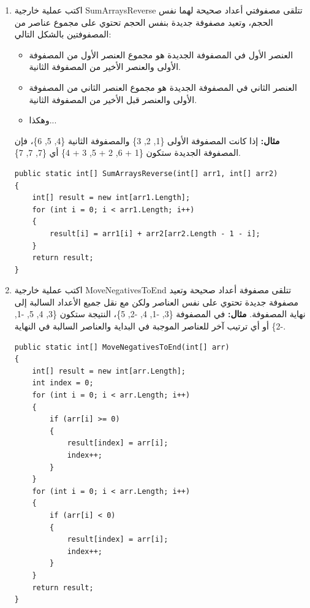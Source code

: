 \documentclass[14pt]{extarticle}
\begin{document}
\begin{enumerate}[itemsep=2em]
    \item
    اكتب عملية خارجية \textenglish{SumArraysReverse} تتلقى مصفوفتي أعداد صحيحة لهما نفس الحجم، وتعيد مصفوفة جديدة بنفس الحجم تحتوي على مجموع عناصر من المصفوفتين بالشكل التالي:
    \begin{itemize}
        \item العنصر الأول في المصفوفة الجديدة هو مجموع العنصر الأول من المصفوفة الأولى والعنصر الأخير من المصفوفة الثانية.
        \item العنصر الثاني في المصفوفة الجديدة هو مجموع العنصر الثاني من المصفوفة الأولى والعنصر قبل الأخير من المصفوفة الثانية.
        \item وهكذا...
    \end{itemize}
    \textbf{مثال:} إذا كانت المصفوفة الأولى \textenglish{\{1, 2, 3\}} والمصفوفة الثانية \textenglish{\{4, 5, 6\}}، فإن المصفوفة الجديدة ستكون \textenglish{\{1 + 6, 2 + 5, 3 + 4\}} أي \textenglish{\{7, 7, 7\}}.
    \ifwithsols
    \begin{boxSolution}
    \begin{english}
    \begin{verbatim}
public static int[] SumArraysReverse(int[] arr1, int[] arr2)
{
    int[] result = new int[arr1.Length];
    for (int i = 0; i < arr1.Length; i++)
    {
        result[i] = arr1[i] + arr2[arr2.Length - 1 - i];
    }
    return result;
}
    \end{verbatim}
    \end{english}
    \end{boxSolution}
    \clearpage
    \fi

    \item اكتب عملية خارجية \textenglish{MoveNegativesToEnd} تتلقى مصفوفة أعداد صحيحة وتعيد مصفوفة جديدة تحتوي على نفس العناصر ولكن مع نقل جميع الأعداد السالبة إلى نهاية المصفوفة.
    \textbf{مثال:} في المصفوفة \textenglish{\{3, -1, 4, -2, 5\}}، النتيجة ستكون \textenglish{\{3, 4, 5, -1, -2\}} أو أي ترتيب آخر للعناصر الموجبة في البداية والعناصر السالبة في النهاية.

    \ifwithsols
    \begin{boxSolution}
    \begin{english}
    \begin{verbatim}
public static int[] MoveNegativesToEnd(int[] arr)
{
    int[] result = new int[arr.Length];
    int index = 0;
    for (int i = 0; i < arr.Length; i++)
    {
        if (arr[i] >= 0)
        {
            result[index] = arr[i];
            index++;
        }
    }
    for (int i = 0; i < arr.Length; i++)
    {
        if (arr[i] < 0)
        {
            result[index] = arr[i];
            index++;
        }
    }
    return result;
}
    \end{verbatim}
    \end{english}
    \end{boxSolution}
    \clearpage
    \fi


\end{enumerate}
\end{document}

